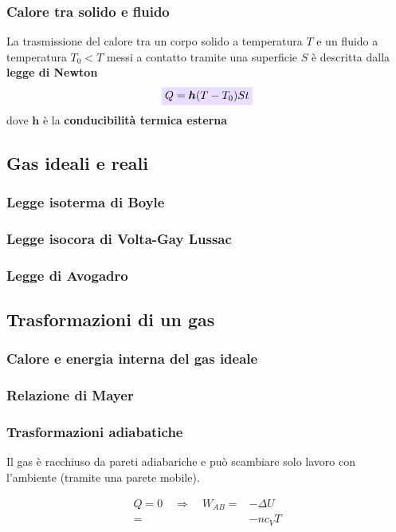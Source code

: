 \documentclass[x11names]{article}
\newcommand{\viola}[1]{\colorbox{yred}{$\displaystyle #1$}}
\begin{document}
	\subsubsection{Calore tra solido e fluido}
	La trasmissione del calore tra un corpo solido a temperatura \(T\) e un fluido a temperatura \(T_0 < T\) messi a contatto tramite una superficie \(S\) è descritta dalla \textbf{legge di Newton}
	\begin{equation}
		\viola{Q = \boldsymbol{h}(T-T_0)St}
	\end{equation}
	dove \(\boldsymbol{h}\) è la \textbf{conducibilità termica esterna}
	
	\subsection{Gas ideali e reali}
	\subsubsection{Legge isoterma di Boyle}
	\subsubsection{Legge isocora di Volta-Gay Lussac}
	\subsubsection{Legge di Avogadro}
	
	\subsection{Trasformazioni  di un gas}
	\subsubsection{Calore e energia interna del gas ideale}
	\subsubsection{Relazione di Mayer}
	
	\subsubsection{Trasformazioni adiabatiche}
	Il gas è racchiuso da pareti adiabariche e può scambiare solo lavoro con l'ambiente (tramite una parete mobile).
	 
	\begin{align*}
		Q = 0 \quad \Rightarrow \quad W_{AB} =& -\Delta U \\
											 =& -nc_{V} T
	\end{align*}
	
\end{document}
